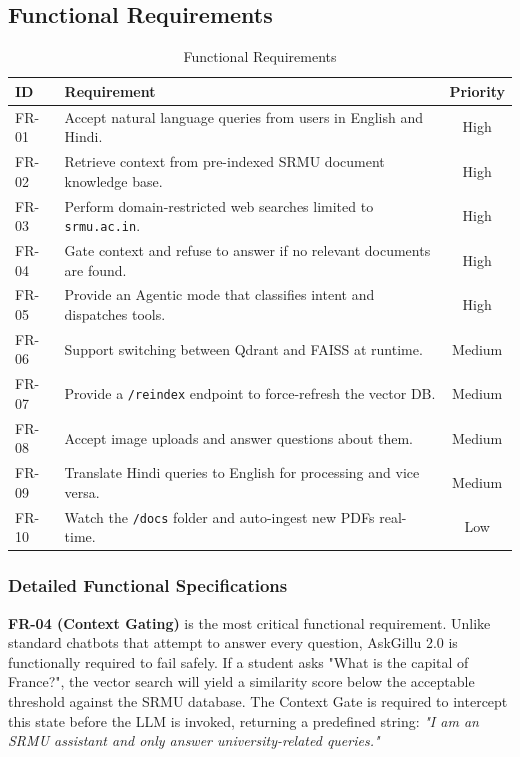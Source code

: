 \documentclass[12pt,a4paper]{report}
\begin{document}
\subsection{Functional Requirements}
\begin{table}[h]
\centering
\caption{Functional Requirements}
\label{tab:func_req}
\begin{tabularx}{\textwidth}{|l|X|c|}
\hline
\textbf{ID} & \textbf{Requirement} & \textbf{Priority} \\ \hline
FR-01 & Accept natural language queries from users in English and Hindi. & High \\ \hline
FR-02 & Retrieve context from pre-indexed SRMU document knowledge base. & High \\ \hline
FR-03 & Perform domain-restricted web searches limited to \texttt{srmu.ac.in}. & High \\ \hline
FR-04 & Gate context and refuse to answer if no relevant documents are found. & High \\ \hline
FR-05 & Provide an Agentic mode that classifies intent and dispatches tools. & High \\ \hline
FR-06 & Support switching between Qdrant and FAISS at runtime. & Medium \\ \hline
FR-07 & Provide a \texttt{/reindex} endpoint to force-refresh the vector DB. & Medium \\ \hline
FR-08 & Accept image uploads and answer questions about them. & Medium \\ \hline
FR-09 & Translate Hindi queries to English for processing and vice versa. & Medium \\ \hline
FR-10 & Watch the \texttt{/docs} folder and auto-ingest new PDFs real-time. & Low \\ \hline
\end{tabularx}
\end{table}

\subsubsection{Detailed Functional Specifications}
\textbf{FR-04 (Context Gating)} is the most critical functional requirement. Unlike standard chatbots that attempt to answer every question, AskGillu 2.0 is functionally required to fail safely. If a student asks "What is the capital of France?", the vector search will yield a similarity score below the acceptable threshold against the SRMU database. The Context Gate is required to intercept this state before the LLM is invoked, returning a predefined string: \textit{"I am an SRMU assistant and only answer university-related queries."}
\end{document}
